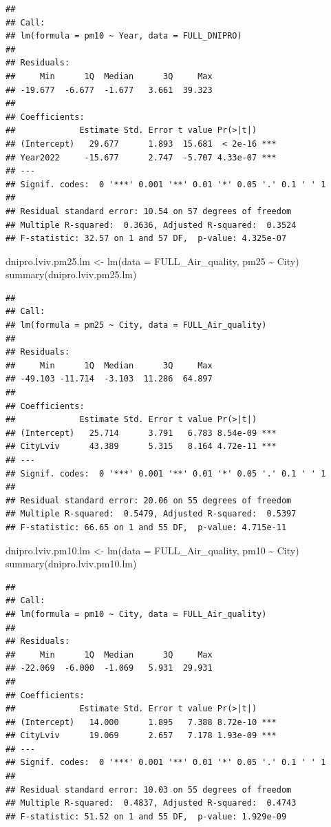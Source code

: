 \documentclass[
  12pt,
]{article}
\newenvironment{Shaded}{\begin{snugshade}}{\end{snugshade}}
\newcommand{\AttributeTok}[1]{\textcolor[rgb]{0.77,0.63,0.00}{#1}}
\newcommand{\FunctionTok}[1]{\textcolor[rgb]{0.00,0.00,0.00}{#1}}
\newcommand{\NormalTok}[1]{#1}
\newcommand{\OtherTok}[1]{\textcolor[rgb]{0.56,0.35,0.01}{#1}}
\newcommand{\SpecialCharTok}[1]{\textcolor[rgb]{0.00,0.00,0.00}{#1}}
\begin{document}
\begin{verbatim}
## 
## Call:
## lm(formula = pm10 ~ Year, data = FULL_DNIPRO)
## 
## Residuals:
##     Min      1Q  Median      3Q     Max 
## -19.677  -6.677  -1.677   3.661  39.323 
## 
## Coefficients:
##             Estimate Std. Error t value Pr(>|t|)    
## (Intercept)   29.677      1.893  15.681  < 2e-16 ***
## Year2022     -15.677      2.747  -5.707 4.33e-07 ***
## ---
## Signif. codes:  0 '***' 0.001 '**' 0.01 '*' 0.05 '.' 0.1 ' ' 1
## 
## Residual standard error: 10.54 on 57 degrees of freedom
## Multiple R-squared:  0.3636, Adjusted R-squared:  0.3524 
## F-statistic: 32.57 on 1 and 57 DF,  p-value: 4.325e-07
\end{verbatim}

\begin{Shaded}
\begin{Highlighting}[]
\NormalTok{dnipro.lviv.pm25.lm }\OtherTok{\textless{}{-}} \FunctionTok{lm}\NormalTok{(}\AttributeTok{data =}\NormalTok{ FULL\_Air\_quality, pm25 }\SpecialCharTok{\textasciitilde{}}\NormalTok{ City) }
\FunctionTok{summary}\NormalTok{(dnipro.lviv.pm25.lm)}
\end{Highlighting}
\end{Shaded}

\begin{verbatim}
## 
## Call:
## lm(formula = pm25 ~ City, data = FULL_Air_quality)
## 
## Residuals:
##     Min      1Q  Median      3Q     Max 
## -49.103 -11.714  -3.103  11.286  64.897 
## 
## Coefficients:
##             Estimate Std. Error t value Pr(>|t|)    
## (Intercept)   25.714      3.791   6.783 8.54e-09 ***
## CityLviv      43.389      5.315   8.164 4.72e-11 ***
## ---
## Signif. codes:  0 '***' 0.001 '**' 0.01 '*' 0.05 '.' 0.1 ' ' 1
## 
## Residual standard error: 20.06 on 55 degrees of freedom
## Multiple R-squared:  0.5479, Adjusted R-squared:  0.5397 
## F-statistic: 66.65 on 1 and 55 DF,  p-value: 4.715e-11
\end{verbatim}

\begin{Shaded}
\begin{Highlighting}[]
\NormalTok{dnipro.lviv.pm10.lm }\OtherTok{\textless{}{-}} \FunctionTok{lm}\NormalTok{(}\AttributeTok{data =}\NormalTok{ FULL\_Air\_quality, pm10 }\SpecialCharTok{\textasciitilde{}}\NormalTok{ City) }
\FunctionTok{summary}\NormalTok{(dnipro.lviv.pm10.lm)}
\end{Highlighting}
\end{Shaded}

\begin{verbatim}
## 
## Call:
## lm(formula = pm10 ~ City, data = FULL_Air_quality)
## 
## Residuals:
##     Min      1Q  Median      3Q     Max 
## -22.069  -6.000  -1.069   5.931  29.931 
## 
## Coefficients:
##             Estimate Std. Error t value Pr(>|t|)    
## (Intercept)   14.000      1.895   7.388 8.72e-10 ***
## CityLviv      19.069      2.657   7.178 1.93e-09 ***
## ---
## Signif. codes:  0 '***' 0.001 '**' 0.01 '*' 0.05 '.' 0.1 ' ' 1
## 
## Residual standard error: 10.03 on 55 degrees of freedom
## Multiple R-squared:  0.4837, Adjusted R-squared:  0.4743 
## F-statistic: 51.52 on 1 and 55 DF,  p-value: 1.929e-09
\end{verbatim}
\end{document}
